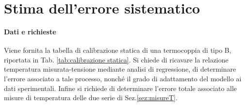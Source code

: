 \section{Stima dell'errore sistematico}

\paragraph{Dati e richieste}
Viene fornita la tabella di calibrazione statica di una termocoppia di tipo B, riportata in Tab. \ref{tab:calibrazione statica}. Si chiede di ricavare la relazione temperatura misurata-tensione mediante analisi di regressione, di determinare l'errore associato a tale processo, nonché il grado di adattamento del modello ai dati sperimentali. Infine si richiede di determinare l'errore totale associato alle misure di temperatura delle due serie di Sez.\ref{sez:misureT}.

